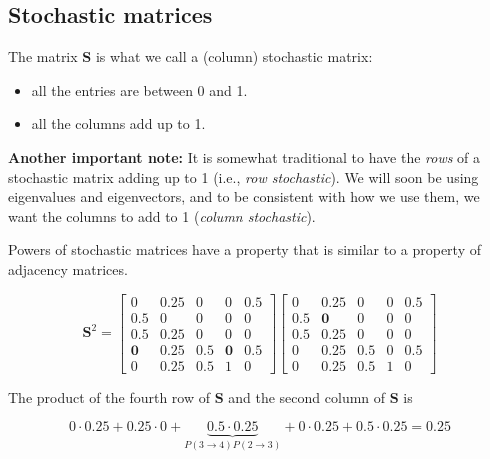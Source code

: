 \documentclass[
]{book}
\theoremstyle{definition}
\theoremstyle{definition}
\theoremstyle{definition}
\theoremstyle{definition}
\theoremstyle{remark}
\begin{document}
\subsection*{Stochastic matrices}\label{stochastic-matrices}

The matrix \(\mathbf{S}\) is what we call a (column) stochastic matrix:

\begin{itemize}
\item
  all the entries are between 0 and 1.
\item
  all the columns add up to 1.
\end{itemize}

\begin{notebox}
\textbf{Another important note:} It is somewhat traditional to have the \emph{rows} of a stochastic matrix adding up to 1 (i.e., \emph{row stochastic}). We will soon be using eigenvalues and eigenvectors, and to be consistent with how we use them, we want the columns to add to 1 (\emph{column stochastic}).

\end{notebox}

Powers of stochastic matrices have a property that is similar to a property of adjacency matrices.

\[\mathbf{S}^2=\begin{bmatrix}
   0 & 0.25 & 0 & 0 & 0.5\\
0.5 & 0 & 0 & 0 & 0\\
0.5 & 0.25 & 0 & 0 & 0\\
\mathbf{0} & \mathbf{0.25} & \mathbf{0.5} & \mathbf{0} & \mathbf{0.5}\\
0 & 0.25 & 0.5 & 1 & 0 \end{bmatrix}
\begin{bmatrix}
   0 & \mathbf{0.25} & 0 & 0 & 0.5\\
0.5 & \mathbf{0} & 0 & 0 & 0\\
0.5 & \mathbf{0.25} & 0 & 0 & 0\\
0 & \mathbf{0.25} & 0.5 & 0 & 0.5\\
0 & \mathbf{0.25} & 0.5 & 1 & 0 
\end{bmatrix}\]

The product of the fourth row of \(\mathbf{S}\) and the second column of \(\mathbf{S}\) is

\[0\cdot 0.25+0.25\cdot 0+\underbrace{0.5\cdot 0.25}_{P(3\to 4)P(2\to 3)}+0\cdot 0.25+0.5\cdot0.25= 0.25\]
\end{document}
